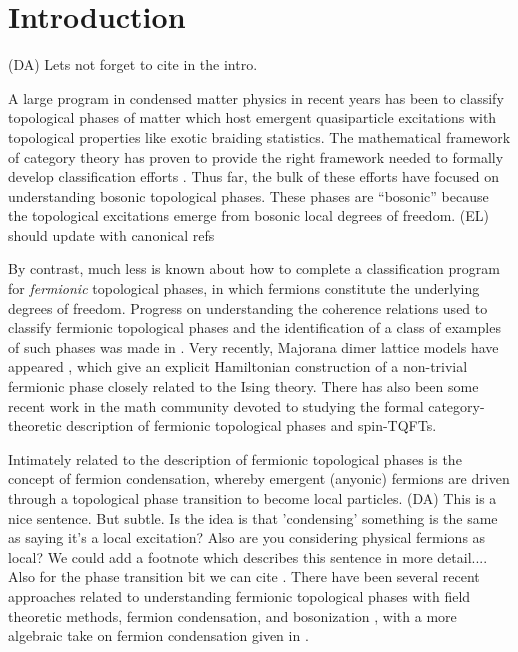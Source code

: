 \documentclass[12pt,a4paper]{article}
\newcommand{\dave}[1]{{\color{ao(english)}\footnotesize{(DA) #1}}}
\newcommand{\ethan}[1]{{\color{amethyst}\footnotesize{(EL) #1}}}
\begin{document}
\tableofcontents



\section{Introduction}

\dave{Lets not forget to cite \cite{Walker2014,Walker2015} in the intro.}

A large program in condensed matter physics in recent years has been to classify 
topological phases of matter which host emergent quasiparticle excitations 
with topological properties like exotic braiding statistics. 
The mathematical framework of category theory has proven to provide the right 
framework needed to formally develop classification efforts \cite{kitaev2006}. 
Thus far, the bulk of these efforts have focused on understanding bosonic topological phases.
These phases are ``bosonic'' because the topological excitations emerge from bosonic 
local degrees of freedom. \ethan{should update with canonical refs}

By contrast, much less is known about how to complete a classification program for {\it fermionic} topological phases, in which fermions constitute 
the underlying degrees of freedom. 
Progress on understanding the coherence relations used to classify fermionic topological phases and the identification of a class of examples of such phases was made in \cite{gu2015,gu2014,Lan2016b}. 
Very recently, Majorana dimer lattice models have appeared \cite{ware2016,tarantino2016}, 
which give an explicit Hamiltonian construction of a 
non-trivial
fermionic phase closely related to the Ising theory. 
There has also been some recent work in the math community \cite{usher2016,brundan2016,bruillard2017,bonderson2017} 
devoted to studying the formal category-theoretic description of fermionic topological phases and spin-TQFTs. 

Intimately related to the description of fermionic topological phases is the concept of fermion condensation, 
whereby emergent (anyonic) fermions are driven through a topological phase transition to become 
local particles. 
\dave{This is a nice sentence. But subtle. 
Is the idea is that 'condensing' something is the same as saying it's a local excitation?
Also are you considering physical fermions as local?
We could add a footnote which describes this sentence in more detail....
Also for the phase transition bit we can cite \cite{Bais2009}.}
There have been several recent approaches related to understanding 
fermionic topological phases with field theoretic methods, fermion condensation, and bosonization \cite{gaiotto2016, bhardwaj2016, bhardwaj2016b,kapustin2017,putrov2016}, 
with a more algebraic take on fermion condensation given in \cite{wan2016}. 
\end{document}
